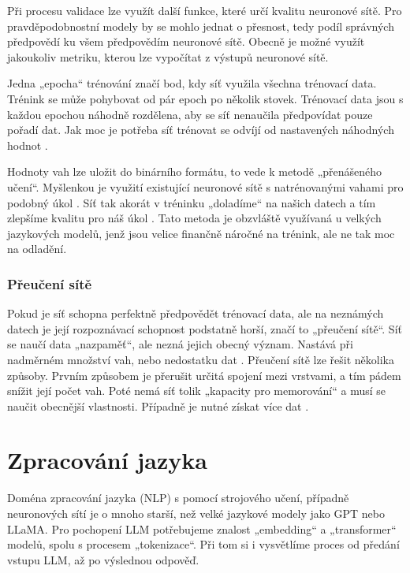 \documentclass[FM,DP]{tulthesis}
\begin{document}
		Při procesu validace lze využít další funkce, které určí kvalitu neuronové sítě. Pro pravděpodobnostní modely by se mohlo jednat o přesnost, tedy podíl správných předpovědí ku všem předpovědím neuronové sítě. Obecně je možné využít jakoukoliv metriku, kterou lze vypočítat z výstupů neuronové sítě.
		
		Jedna „epocha“ trénování značí bod, kdy síť využila všechna trénovací data. Trénink se může pohybovat od pár epoch po několik stovek. Trénovací data jsou s každou epochou náhodně rozdělena, aby se síť nenaučila předpovídat pouze pořadí dat. Jak moc je potřeba síť trénovat se odvíjí od nastavených náhodných hodnot \cite{tds_train}. 
		
		Hodnoty vah lze uložit do binárního formátu, to vede k metodě „přenášeného učení“. Myšlenkou je využití existující neuronové sítě s natrénovanými vahami pro podobný úkol \cite{wiki:transfer}. Síť tak akorát v tréninku „doladíme“ na našich datech a tím zlepšíme kvalitu pro náš úkol \cite{hgf:finetune}. Tato metoda je obzvláště využívaná u velkých jazykových modelů, jenž jsou velice finančně náročné na trénink, ale ne tak moc na odladění.
		
		\subsection{Přeučení sítě} \label{overfit}
		Pokud je síť schopna perfektně předpovědět trénovací data, ale na neznámých datech je její rozpoznávací schopnost podstatně horší, značí to „přeučení sítě“. Síť se naučí data „nazpaměť“, ale nezná jejich obecný význam. Nastává při nadměrném množství vah, nebo nedostatku dat \cite{overfitting_wiki}. Přeučení sítě lze řešit několika způsoby. Prvním způsobem je přerušit určitá spojení mezi vrstvami, a tím pádem snížit její počet vah. Poté nemá síť tolik „kapacity pro memorování“ a musí se naučit obecnější vlastnosti. Případně je nutné získat více dat \cite{overfitting_ml}.
		
		\chapter{Zpracování jazyka}
		Doména zpracování jazyka (NLP) s pomocí strojového učení, případně neuronových sítí je o mnoho starší, než velké jazykové modely jako GPT nebo LLaMA. Pro pochopení LLM potřebujeme znalost „embedding“ a „transformer“ modelů, spolu s procesem „tokenizace“. Při tom si i vysvětlíme proces od předání vstupu LLM, až po výslednou odpověď.
		
\end{document}
